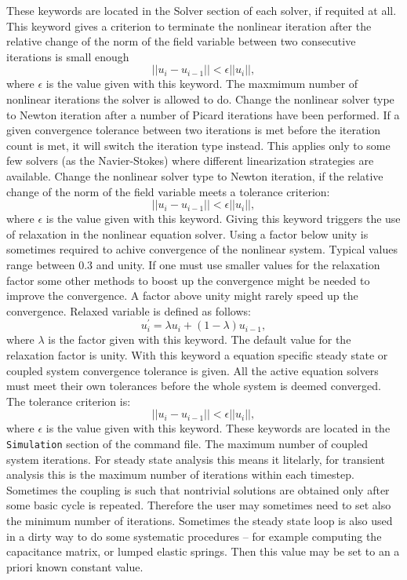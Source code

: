 These keywords are located in the Solver section of each solver, if requited at all.
\sifbegin
{} 
This keyword gives a criterion to
terminate the nonlinear iteration after the relative change of the norm of the field variable
between two consecutive iterations is small enough
$$
 ||u_i-u_{i-1}|| < \epsilon ||u_i||,
$$
where $\epsilon$ is the value given with this keyword.
%
The maxmimum number of nonlinear iterations the
solver is allowed to do.
%
Change the nonlinear solver type to
Newton iteration after a number of Picard iterations have been performed. If a given
convergence tolerance between two iterations is met before the iteration count is met,
it will switch the iteration type instead. This applies only to some few solvers (as the Navier-Stokes)
where different linearization strategies are available.
%
Change the nonlinear solver type to
Newton iteration, if the relative change of the norm of the field variable meets a
tolerance criterion:
$$
 ||u_i-u_{i-1}|| < \epsilon ||u_i||,
$$
where $\epsilon$ is the value given with this keyword.
%
Giving this keyword triggers the use
of  relaxation in the nonlinear equation solver.
Using a factor below unity is sometimes required to achive convergence of the nonlinear system.
Typical values range between 0.3 and unity. If one must use smaller values for the relaxation
factor some other methods to boost up the convergence might be needed to improve the convergence.
A factor above unity might rarely speed up the convergence. Relaxed variable is defined as follows:
$$
 u^{'}_i = \lambda u_i + (1-\lambda) u_{i-1},
$$
where $\lambda$ is the factor given with this keyword. The default value for the relaxation factor
is unity. 
%
With this keyword a equation specific steady state or coupled system
convergence tolerance is given.
All the active equation solvers must meet their own tolerances before the 
whole system is deemed converged.
The tolerance criterion is:
$$
 ||u_i-u_{i-1}|| < \epsilon ||u_i||,
$$
where $\epsilon$ is the value given with this keyword.
\sifend 
These keywords are located in the \texttt{Simulation} section
of the command file.
\sifbegin
{}
The maximum number of coupled system iterations. For steady state analysis this means
it litelarly, for transient analysis this is the maximum number of iterations within each timestep.
Sometimes the coupling is such that nontrivial solutions are obtained only after some basic
cycle is repeated. Therefore the user may sometimes need to set also the minimum number of
iterations. Sometimes the steady state loop is also used in a dirty way to do some 
systematic procedures -- for example computing the capacitance matrix, or lumped elastic springs.
Then this value may be set to an a priori known constant value.
\sifend







